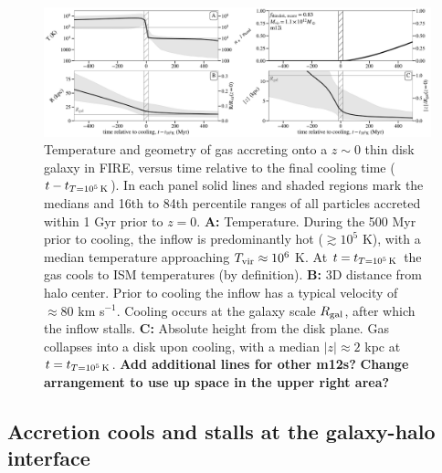 \documentclass[fleqn,usenatbib]{mnras}
\newcommand{\tcon}{t_{T=10^5\,{\rm K}}}
\newcommand{\Tvir}{T_{\rm vir}}
\begin{document}
\begin{figure}
\includegraphics[width=\textwidth]{figures/before_and_after/before_and_after_characteristics_m12i_md.pdf}
\caption{
Temperature and geometry of gas accreting onto a $z\sim0$ thin disk galaxy in FIRE, versus time relative to the final cooling time ($t - \tcon$).
In each panel solid lines and shaded regions mark the medians and 16th to 84th percentile ranges of all particles accreted within 1 Gyr prior to $z=0$.
\textbf{A:}
Temperature. During the 500 Myr prior to cooling, the inflow is predominantly hot ($\gtrsim 10^5$ K), with a median temperature approaching $\Tvir\approx10^6$ K. At $t = \tcon$ the gas cools to ISM temperatures (by definition).
\textbf{B:}
3D distance from halo center. Prior to cooling the inflow has a typical velocity of $\approx 80$ km s$^{-1}$. Cooling occurs at the galaxy scale $R_{\rm gal}$, after which the inflow stalls.
\textbf{C:}
Absolute height from the disk plane.
Gas collapses into a disk upon cooling, with a median $\vert z \vert \approx 2$ kpc at $t=\tcon$.
\textbf{Add additional lines for other m12s?}
\textbf{Change arrangement to use up space in the upper right area?}
}
\label{f: before and after A}
\end{figure}


\subsection{Accretion cools and stalls at the galaxy-halo interface}
\label{s: characteristics -- cools}
\end{document}
